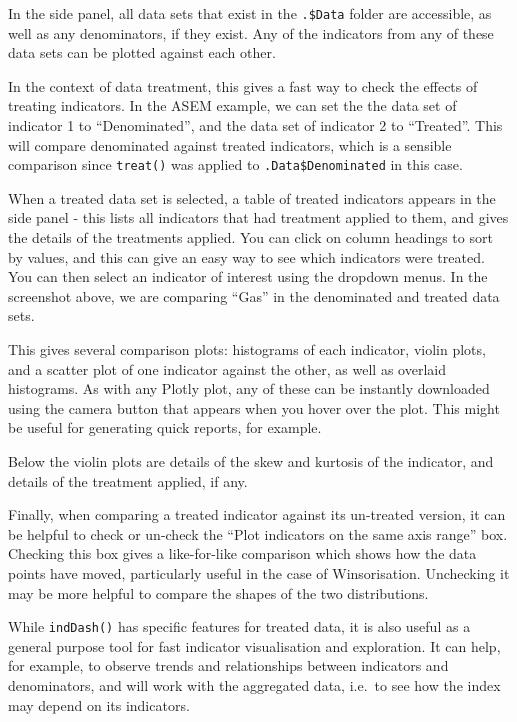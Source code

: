 \documentclass[
]{book}
\begin{document}
In the side panel, all data sets that exist in the \texttt{.\$Data} folder are accessible, as well as any denominators, if they exist. Any of the indicators from any of these data sets can be plotted against each other.

In the context of data treatment, this gives a fast way to check the effects of treating indicators. In the ASEM example, we can set the the data set of indicator 1 to ``Denominated'', and the data set of indicator 2 to ``Treated''. This will compare denominated against treated indicators, which is a sensible comparison since \texttt{treat()} was applied to \texttt{.Data\$Denominated} in this case.

When a treated data set is selected, a table of treated indicators appears in the side panel - this lists all indicators that had treatment applied to them, and gives the details of the treatments applied. You can click on column headings to sort by values, and this can give an easy way to see which indicators were treated. You can then select an indicator of interest using the dropdown menus. In the screenshot above, we are comparing ``Gas'' in the denominated and treated data sets.

This gives several comparison plots: histograms of each indicator, violin plots, and a scatter plot of one indicator against the other, as well as overlaid histograms. As with any Plotly plot, any of these can be instantly downloaded using the camera button that appears when you hover over the plot. This might be useful for generating quick reports, for example.

Below the violin plots are details of the skew and kurtosis of the indicator, and details of the treatment applied, if any.

Finally, when comparing a treated indicator against its un-treated version, it can be helpful to check or un-check the ``Plot indicators on the same axis range'' box. Checking this box gives a like-for-like comparison which shows how the data points have moved, particularly useful in the case of Winsorisation. Unchecking it may be more helpful to compare the shapes of the two distributions.

While \texttt{indDash()} has specific features for treated data, it is also useful as a general purpose tool for fast indicator visualisation and exploration. It can help, for example, to observe trends and relationships between indicators and denominators, and will work with the aggregated data, i.e.~to see how the index may depend on its indicators.
\end{document}
